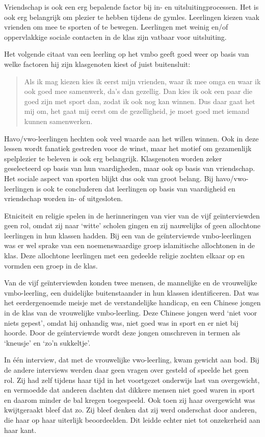 \documentclass[a4paper,12pt]{memoir}
\begin{document}
Vriendschap is ook een erg bepalende factor bij in- en uitsluitingprocessen. Het is ook erg belangrijk om plezier te hebben tijdens de gymles. Leerlingen kiezen vaak vrienden om mee te sporten of te bewegen. Leerlingen met weinig en/of oppervlakkige sociale contacten in de klas zijn vatbaar voor uitsluiting.

Het volgende citaat van een leerling op het vmbo geeft goed weer op basis van welke factoren hij zijn klasgenoten kiest of juist buitensluit:

\begin{quote}Als ik mag kiezen kies ik eerst mijn vrienden, waar ik mee omga en waar ik ook goed mee samenwerk, da's dan gezellig. Dan kies ik ook een paar die goed zijn met sport dan, zodat ik ook nog kan winnen. Dus daar gaat het mij om, het gaat mij eerst om de gezelligheid, je moet goed met iemand kunnen samenwerken.\end{quote}

Havo/vwo-leerlingen hechten ook veel waarde aan het willen winnen. Ook in deze lessen wordt fanatiek gestreden voor de winst, maar het motief om gezamenlijk spelplezier te beleven is ook erg belangrijk. Klasgenoten worden zeker geselecteerd op basis van hun vaardigheden, maar ook op basis van vriendschap. Het sociale aspect van sporten blijkt dus ook van groot belang. Bij havo/vwo-leerlingen is ook te concluderen dat leerlingen op basis van vaardigheid en vriendschap worden in- of uitgesloten.

Etniciteit en religie spelen in de herinneringen van vier van de vijf geïnterviewden geen rol, omdat zij naar `witte' scholen gingen en zij nauwelijks of geen allochtone leerlingen in hun klassen hadden. Bij een van de geïnterviewde vmbo-leerlingen was er wel sprake van een noemenswaardige groep islamitische allochtonen in de klas. Deze allochtone leerlingen met een gedeelde religie zochten elkaar op en vormden een groep in de klas.

Van de vijf geïnterviewden konden twee mensen, de mannelijke en de vrouwelijke vmbo-leerling, een duidelijke buitenstaander in hun klassen identificeren. Dat was het eerdergenoemde meisje met de verstandelijke handicap, en een Chinese jongen in de klas van de vrouwelijke vmbo-leerling. Deze Chinese jongen werd `niet voor niets gepest', omdat hij onhandig was, niet goed was in sport en er niet bij hoorde. Door de geïnterviewde wordt deze jongen omschreven in termen als `kneusje' en `zo'n sukkeltje'.

In één interview, dat met de vrouwelijke vwo-leerling, kwam gewicht aan bod. Bij de andere interviews werden daar geen vragen over gesteld of speelde het geen rol. Zij had zelf tijdens haar tijd in het voortgezet onderwijs last van overgewicht, en vermoedde dat anderen dachten dat dikkere mensen niet goed waren in sport en daarom minder de bal kregen toegespeeld. Ook toen zij haar overgewicht was kwijtgeraakt bleef dat zo. Zij bleef denken dat zij werd onderschat door anderen, die haar op haar uiterlijk beoordeelden. Dit leidde echter niet tot onzekerheid aan haar kant.
\end{document}
